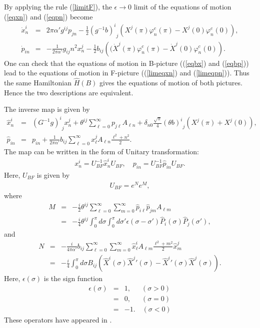 \documentclass[a4paper,12pt]{article}
\newcommand{\nn}{\nonumber\\}
\newcommand{\co}{\varphi^c}
\newcommand{\e}{\epsilon}
\begin{document}
By applying the rule (\ref{limitF}),
the $\e \rightarrow 0$ limit of the
equations of motion (\ref{eqxn}) and (\ref{eqpn})
become
\begin{eqnarray}
 \label{limeqxn}
\dot{x}^i_n &=& 
2\pi\alpha' g^{ij} p_{jn}
- \frac{1}{2}  {(g^{-1}b)^i}_j
\left(
X^j(\pi)\co_n(\pi)-X^j(0)\co_n(0)
\right), \\
 \label{limeqpn}
\dot{p}_{in} 
&=&
-\frac{1}{2\pi\alpha'} 
g_{ij} n^2 x_n^j
-\frac{1}{2}
 b_{ij} 
\left(
(\dot{X}^j(\pi)\co_n(\pi)-\dot{X}^j(0)\co_n(0)
\right) .
\end{eqnarray}
One can check that 
the equations of motion in
B-picture 
((\ref{eqbx}) and (\ref{eqbp}))
lead to the equations of
motion in F-picture 
((\ref{limeqxn}) and (\ref{limeqpn})).
Thus the same Hamiltonian $\hat{H}(B)$ 
gives the equations of motion
of both pictures.
Hence the two descriptions are equivalent.

The inverse map is given by
\begin{eqnarray}
 \hat{x}^i_n
&=&
{(G^{-1}g)^i}_j
x^j_n 
+
\theta^{ij} \sum_{\ell=0}^\infty  p_{j \ell} A_{\ell n}  
+ \delta_{n0} \frac{\sqrt{\pi}}{4}
{{(\theta b)}^i}_j
\left(
X^j(\pi) + X^j(0)
\right),
\label{hx}\\
\hat{p}_{i n} &=&
p_{in}
+ \frac{1}{2\pi\alpha'} b_{ij}
\sum_{\ell=0}^\infty x_\ell^j A_{\ell n} \frac{\ell^2+n^2}{2}.
\label{hp}
\end{eqnarray}
The
map can be written in the form of
Unitary transformation:
\begin{eqnarray}
  \label{Bogoh}
x_n^i = U_{\scriptscriptstyle BF}^{-1} 
\hat{x}_n^i U_{\scriptscriptstyle BF}, \quad 
p_{i n} = U^{-1}_{\scriptscriptstyle BF} 
\hat{p}_{i n} U_{\scriptscriptstyle BF}.
\end{eqnarray}
Here, $U_{\scriptscriptstyle BF}$ is given by
\begin{eqnarray}
 \label{BogoU}
U_{\scriptscriptstyle BF} = e^N e^M,
\end{eqnarray}
where
\begin{eqnarray}
 \label{defM}
M &=& 
-\frac{i}{2} \theta^{ij} 
\sum_{\ell=0}^\infty
\sum_{m=0}^\infty \hat{p}_{i \ell} \hat{p}_{j m} 
A_{\ell m} \nn
&=&
-\frac{i}{4} \theta^{ij} \int_0^\pi d\sigma 
\int_0^\pi d\sigma'
\e (\sigma-\sigma') \hat{P}_i(\sigma ) \hat{P}_j (\sigma' ), 
\end{eqnarray}
and
\begin{eqnarray}
 \label{defN}
N &=& 
-\frac{i}{4\pi \alpha'} b_{ij} 
\sum_{\ell=0}^\infty \sum_{m =0}^\infty
\hat{x}_{\ell}^i A_{\ell m} \frac{\ell^2 + m^2}{2} \hat{x}_m^j \nn
&=& 
-\frac{i}{4} \int_0^\pi d\sigma 
B_{ij} 
\left(
 \hat{X}^i(\sigma) \hat{X}^{j}{}' (\sigma) -
 \hat{X}^{i}{}' (\sigma) {\hat{X}^j}(\sigma)
\right).
\end{eqnarray}
Here, $\e (\sigma)$
is the sign function
\begin{eqnarray}
\e (\sigma) 
&=& 1 , \quad \,\,\,(\sigma > 0) \nn
&=& 0 , \quad \,\,\,(\sigma = 0) \nn
&=& -1 . \quad(\sigma <0)
\end{eqnarray}
These operators
have appeared
in \cite{Sgi,KT1,KT2}.
\end{document}
